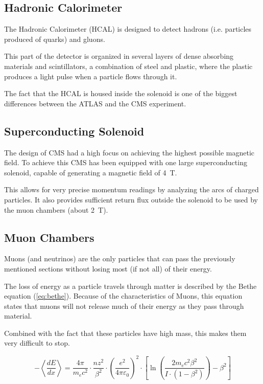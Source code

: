 \subsection{Hadronic Calorimeter}
The Hadronic Calorimeter (HCAL) is designed to detect hadrons (i.e. particles
produced of quarks) and gluons.

This part of the detector is organized in several layers of dense absorbing materials and scintillators,
a combination of steel and plastic, where the plastic produces a light pulse when a particle flows through it.

The fact that the HCAL is housed inside the solenoid is one of the biggest
differences between the ATLAS and the CMS experiment.
\subsection{Superconducting Solenoid}
The design of CMS had a high focus on achieving the highest possible magnetic
field. To achieve this CMS has been equipped with one large superconducting
solenoid, capable of generating a magnetic field of \SI{4}{\tesla}.

This allows for very precise momentum readings by analyzing the arcs of charged
particles. It also provides sufficient return flux outside
the solenoid to be used by the muon chambers (about \SI{2}{\tesla}).
\subsection{Muon Chambers}
Muons (and neutrinos) are the only particles that can pass the previously
mentioned sections without losing most (if not all) of their energy.

The loss of energy as a particle travels through matter is  described by the
Bethe equation (\ref{eq:bethe}). Because of the characteristics of Muons,
this equation states that muons will not
release much of their energy as they pass through material.

Combined with the fact that these particles have high mass, this makes them very difficult to stop.

\begin{equation} \label{eq:bethe}
- \left\langle\frac{dE}{dx}\right\rangle = \frac{4 \pi}{m_e c^2} \cdot \frac{nz^2}{\beta^2} \cdot \left(\frac{e^2}{4\pi\varepsilon_0}\right)^2 \cdot \left[\ln \left(\frac{2m_e c^2 \beta^2}{I \cdot (1-\beta^2)}\right) - \beta^2\right]
\end{equation}

